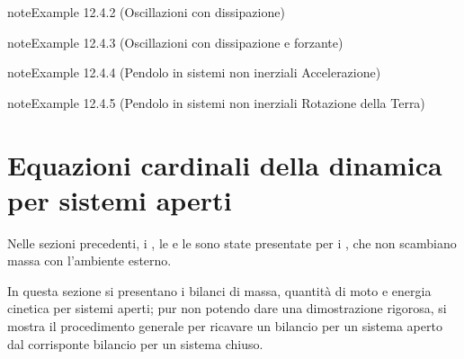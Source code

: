 \documentclass[letterpaper,10pt,italian]{jupyterBook}
\begin{document}
\label{ch/mechanics/dynamics-examples:pendulum-free-damped}
\begin{sphinxadmonition}{note}{Example 12.4.2 (Oscillazioni con dissipazione)}


\end{sphinxadmonition}
\label{ch/mechanics/dynamics-examples:pendulum-free-damped-forced}
\begin{sphinxadmonition}{note}{Example 12.4.3 (Oscillazioni con dissipazione e forzante)}


\end{sphinxadmonition}
\label{ch/mechanics/dynamics-examples:pendulum-noninertial-acceleration}
\begin{sphinxadmonition}{note}{Example 12.4.4 (Pendolo in sistemi non inerziali \sphinxhyphen{} Accelerazione)}


\end{sphinxadmonition}
\label{ch/mechanics/dynamics-examples:pendulum-noninertial-earth-rotation}
\begin{sphinxadmonition}{note}{Example 12.4.5 (Pendolo in sistemi non inerziali \sphinxhyphen{} Rotazione della Terra)}


\end{sphinxadmonition}

\sphinxstepscope


\section{Equazioni cardinali della dinamica per sistemi aperti}
\label{\detokenize{ch/mechanics/dynamics-eom-open:equazioni-cardinali-della-dinamica-per-sistemi-aperti}}\label{\detokenize{ch/mechanics/dynamics-eom-open:physics-hs-mechanics-dynamics-eom-open}}\label{\detokenize{ch/mechanics/dynamics-eom-open::doc}}
\sphinxAtStartPar
Nelle sezioni precedenti, i {\hyperref[\detokenize{ch/mechanics/dynamics-eom:physics-hs-mechanics-dynamics-eom}]{}}, le {\hyperref[\detokenize{ch/mechanics/dynamics-eom:physics-hs-mechanics-dynamics-eom}]{}} e le {\hyperref[\detokenize{ch/mechanics/dynamics-conservation:physics-hs-mechanics-dynamics-conservation}]{}} sono state presentate per i , che non scambiano massa con l’ambiente esterno.

\sphinxAtStartPar
In questa sezione si presentano i bilanci di massa, quantità di moto e energia cinetica per sistemi aperti; pur non potendo dare una dimostrazione rigorosa, si mostra il procedimento generale per ricavare un bilancio per un sistema aperto dal corrisponte bilancio per un sistema chiuso.
\end{document}
